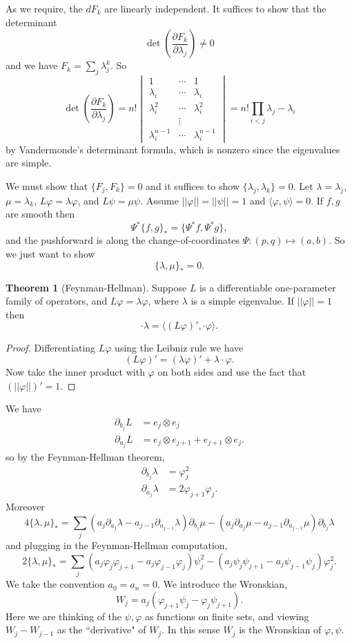 \documentclass[12pt]{report}
\theoremstyle{definition}
\newtheorem{theorem}{Theorem}[chapter]
\begin{document}
As we require, the $dF_k$ are linearly independent. It suffices to show that the determinant
$$\det\left(\frac{\partial F_k}{\partial \lambda_j}\right) \neq 0$$
and we have $F_k = \sum_j \lambda_j^k$. So
$$\det\left(\frac{\partial F_k}{\partial \lambda_j}\right) = n! \begin{vmatrix}1 & \cdots & 1\\
\lambda_i & \cdots & \lambda_i\\
\lambda_i^2 & \cdots & \lambda_i^2\\
&\vdots\\
\lambda_i^{n-1}& \cdots & \lambda_i^{n-1}\end{vmatrix} = n!\prod_{i<j} \lambda_j - \lambda_i$$
by Vandermonde's determinant formula, which is nonzero since the eigenvalues are simple.

We must show that $\{F_j, F_k\} = 0$ and it suffices to show $\{\lambda_j, \lambda_k\} = 0$.
Let $\lambda = \lambda_j$, $\mu = \lambda_k$, $L\varphi = \lambda\varphi$, and $L\psi = \mu\psi$.
Assume $||\varphi|| = ||\psi|| = 1$ and $\langle \varphi, \psi\rangle = 0$.
If $f,g$ are smooth then
$$\Psi^* \{f, g\}_* = \{\Psi^*f, \Psi^*g\},$$
and the pushforward is along the change-of-coordinates $\Psi: (p, q) \mapsto (a, b)$.
So we just want to show
$$\{\lambda, \mu\}_* = 0.$$
\begin{theorem}[Feynman-Hellman]
Suppose $L$ is a differentiable one-parameter family of operators, and $L\varphi = \lambda\varphi$, where $\lambda$ is a simple eigenvalue. If $||\varphi|| = 1$ then
$$\cdot \lambda = \langle (L\varphi)', \cdot \varphi\rangle.$$
\end{theorem}
\begin{proof}
Differentiating $L\varphi$ using the Leibniz rule we have
$$(L\varphi)' = (\lambda \varphi)' + \lambda\cdot \varphi.$$
Now take the inner product with $\varphi$ on both sides and use the fact that $(||\varphi||)' = 1$.
\end{proof}
We have
\begin{align*}
\partial_{b_j} L &= e_j \otimes e_j\\
\partial_{a_j} L &= e_j \otimes e_{j+1} + e_{j+1} \otimes e_j.
\end{align*}
so by the Feynman-Hellman theorem,
\begin{align*}
\partial_{b_j} \lambda &= \varphi_j^2\\
\partial_{a_j} \lambda &= 2\varphi_{j+1}\varphi_j.
\end{align*}
Moreover
$$4\{\lambda, \mu\}_* = \sum_j (a_j \partial_{a_j}\lambda - a_{j-1}\partial_{a_{j-1}}\lambda)\partial_{b_j}\mu - (a_j\partial_{a_j} \mu - a_{j-1}\partial_{a_{j-1}}\mu)\partial_{b_j}\lambda$$
and plugging in the Feynman-Hellman computation,
$$2\{\lambda, \mu\}_* = \sum_j (a_j \varphi_j\varphi_{j+1} - a_j\varphi_{j-1}\varphi_j)\psi_j^2 - (a_j\psi_j\psi_{j+1} - a_j\psi_{j-1}\psi_j)\varphi_j^2.$$
We take the convention $a_0 = a_n = 0$. We introduce the Wronskian,
$$W_j = a_j(\varphi_{j+1}\psi_j - \varphi_j \psi_{j+1}).$$
Here we are thinking of the $\psi,\varphi$ as functions on finite sets, and viewing $W_j - W_{j-1}$ as the ``derivative" of $W_j$.
In this sense $W_j$ is the Wronskian of $\varphi,\psi$.
\end{document}

